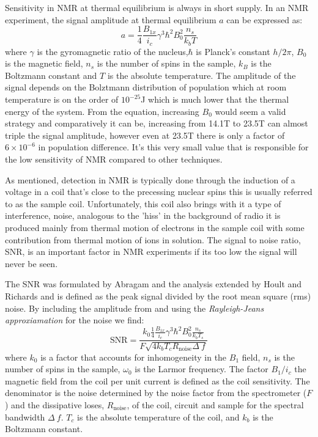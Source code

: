  Sensitivity in NMR at thermal equilibrium is always in short supply. In an NMR experiment, the signal amplitude
 at thermal equilibrium $a$ can be expressed as:
\begin{equation}\label{eqn:Hale}
 a = \frac{1}{4}\frac{B_{1x}}{i_c}\gamma^3\hbar^2B_0^2\frac{n_s}{k_bT}
\end{equation}
where $\gamma$ is the gyromagnetic ratio of the nucleus,$\hbar$ is Planck's constant $h/2\pi$, $B_0$ is the magnetic field, $n_s$ is
the number of spins in the sample, $k_B$ is the Boltzmann constant and $T$ is the absolute temperature. The amplitude
of the signal depends on the Bolztmann distribution of population which at room temperature is on the order of $10^{-25}$J
which is much lower that the thermal energy of the system. From the equation, increasing $B_0$ would seem a
valid strategy and comparatively it can be, increasing from 14.1T to 23.5T can almost triple the signal amplitude,
however even at 23.5T there is only a factor of ~$6\times10^{-6}$ in population difference. It's this
very small value that is responsible for the low sensitivity of NMR compared to other techniques.

As mentioned, detection in NMR is typically done through the induction of a voltage in a coil that's close
to the precessing nuclear spins this is usually referred to as the sample coil. Unfortunately,
this coil also brings with it a type of interference, noise, analogous to the 'hiss' in the background
of radio it is produced mainly from thermal motion of electrons in the sample coil with some contribution from thermal
motion of ions in solution. The signal to noise ratio, SNR, is an important factor in NMR experiments if its too low
the signal will never be seen.

The SNR was formulated by Abragam\citep{Abragam:1961vg} and the analysis extended by Hoult and
Richards\citep{Hoult:1976dw} and is defined as the peak signal divided by the root mean square (rms) noise. By including
the amplitude from  and using the \textit{Rayleigh-Jeans approxiamation} for the noise we find:
\begin{equation}\label{eqn:SNR}
  \text{SNR} = \frac{k_0\frac{1}{4}\frac{B_{1x}}{i_c}\gamma^3\hbar^2B_0^2\frac{n_s}{k_bT_s}}{F\sqrt{4k_bT_cR_{\text{noise}}\Delta~f}}
\end{equation}
where $k_0$ is a factor that accounts for inhomogeneity in the $B_1$ field, $n_s$ is the number of spins in the sample,
$\omega_0$ is the Larmor frequency. The factor $B_1/i_c$ the magnetic field from the coil per unit current is defined
as the coil sensitivity. The denominator is the noise determined by the noise factor from the spectrometer ($F$) and
the dissipative loses, $R_{\text{noise}}$, of the coil, circuit and sample for the spectral bandwidth $\Delta~f$.
$T_c$ is the absolute temperature of the coil, and $k_b$ is the Boltzmann constant.

